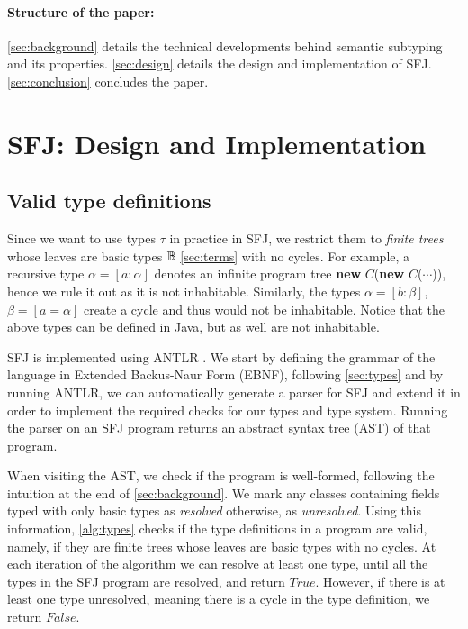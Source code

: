 \documentclass[runningheads]{llncs}
\begin{document}
\paragraph{Structure of the paper:}
\autoref{sec:background} details the technical developments behind semantic subtyping and its properties.
\autoref{sec:design} details the design and implementation of SFJ.
\autoref{sec:conclusion} concludes the paper.



\section{SFJ: Design and Implementation}
\label{sec:design}
\subsection{Valid type definitions}
Since we want to use types $\tau$ in practice in SFJ, we restrict them to \emph{finite trees} whose leaves are basic types ${\mathbb B}$ \autoref{sec:terms} with no cycles.
For example, a recursive type $\alpha = [a : \alpha]$ denotes an infinite program tree \textbf{new} $C$(\textbf{new} $C$($\cdots{}$)), hence we rule it out as it is not inhabitable. Similarly, the types $\alpha = [b: \beta]$, $\beta = [a = \alpha]$ create a cycle and thus would not be inhabitable.
Notice that the above types can be defined in Java, but as well are not inhabitable.

SFJ is implemented using ANTLR \cite{parr2013}. We start by defining the grammar of the language in Extended Backus-Naur Form (EBNF), following \autoref{sec:types} and by running ANTLR, we can automatically generate a parser for SFJ and extend it in order to implement the required checks for our types and type system. Running the parser on an SFJ program returns an abstract syntax tree (AST) of that program. 

When visiting the AST, we check if the program is well-formed, following the intuition at the end of \autoref{sec:background}. We mark any classes containing fields typed with only basic types as \emph{resolved} otherwise, as \emph{unresolved}.
Using this information, \autoref{alg:types} checks if the type definitions in a program are valid, namely, if they are finite trees whose leaves are basic types with no cycles.
%
At each iteration of the algorithm we can resolve at least one type, until all the types in the SFJ program are resolved, and return $True$. However, if there is at least one type unresolved, meaning there is a cycle in the type definition, we return $False$.
\end{document}
